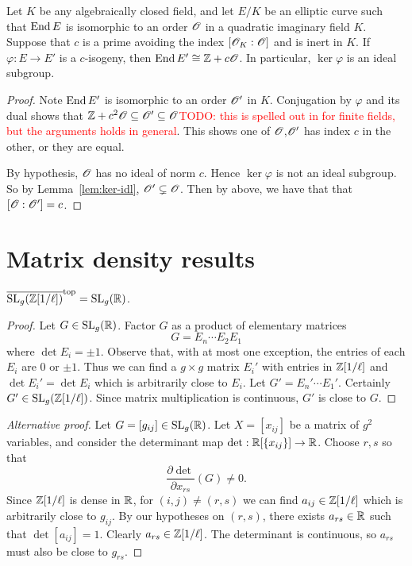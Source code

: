 \documentclass{amsart}
\begin{document}
\begin{lemma}\label{lem:ker-idl-end}
  Let $K$ be any algebraically closed field, and let $E/K$ be an elliptic curve such that $\operatorname{End} E$ is isomorphic to an order $\mathscr{O}$ in a quadratic imaginary field $K$. Suppose that $c$ is a prime avoiding the index $[\mathscr{O}_K : \mathscr{O}]$ and is inert in $K$. If $\varphi: E \to E'$ is a $c$-isogeny, then $\operatorname{End} E' \cong \mathbb{Z} + c\mathscr{O}$. In particular, $\ker\varphi$ is an ideal subgroup.
\end{lemma}
\begin{proof}
  Note $\operatorname{End} E'$ is isomorphic to an order $\mathscr{O}'$ in $K$. Conjugation by $\varphi$ and its dual shows that $\mathbb{Z} + c^2\mathscr{O} \subseteq \mathscr{O}' \subseteq \mathscr{O}$\textcolor{red}{TODO: this is spelled out in \cite[Prop.~21]{kohel1996endomorphisms} for finite fields, but the arguments holds in general}. This shows one of $\mathscr{O}$,$\mathscr{O}'$ has index $c$ in the other, or they are equal.

  By hypothesis, $\mathscr{O}$ has no ideal of norm $c$. Hence $\ker\varphi$ is not an ideal subgroup. So by Lemma~\ref{lem:ker-idl}, $\mathscr{O}' \subsetneq \mathscr{O}$. Then by above, we have that that $[\mathscr{O} : \mathscr{O}'] = c$.
\end{proof}


\section{Matrix density results}
\label{sec:matr-dens-results}

\begin{lemma}\label{lemma:sl-z-1overl-dense-sl-r}
  $\overline{\operatorname{SL}_g(\mathbb{Z}[1/\ell])}^\mathrm{top} = \operatorname{SL}_g(\mathbb{R})$.
\end{lemma}

\begin{proof}
  Let $G \in \operatorname{SL}_g(\mathbb{R})$. Factor $G$ as a product of elementary matrices
  \[
    G = E_n \cdots E_2 E_1
  \]
  where $\det E_i = \pm 1$. Observe that, with at most one exception, the entries of each $E_i$ are $0$ or $\pm 1$. Thus we can find a $g \times g$ matrix $E_i'$ with entries in $\mathbb{Z}[1/\ell]$ and $\det E_i' = \det E_i$ which is arbitrarily close to $E_i$. Let $G' = E_n' \cdots E_1'$. Certainly $G' \in \operatorname{SL}_g(\mathbb{Z}[1/\ell])$. Since matrix multiplication is continuous, $G'$ is close to $G$.
\end{proof}

\begin{proof}[Alternative proof]
  Let $G = [g_{ij}] \in \operatorname{SL}_g(\mathbb{R})$. Let $X = [x_{ij}]$ be a matrix of $g^2$ variables, and consider the determinant map $\det: \mathbb{R}[\{x_{ij}\}] \to \mathbb{R}$. Choose $r,s$ so that
  \[
    \frac{\partial \det}{\partial x_{rs}}(G) \neq 0.
  \]
  Since $\mathbb{Z}[1/\ell]$ is dense in $\mathbb{R}$, for $(i,j) \neq (r,s)$ we can find $a_{ij} \in \mathbb{Z}[1/\ell]$ which is arbitrarily close to $g_{ij}$. By our hypotheses on $(r,s)$, there exists $a_{rs} \in \mathbb{R}$ such that $\det [a_{ij}] = 1$. Clearly $a_{rs} \in \mathbb{Z}[1/\ell]$. The determinant is continuous, so $a_{rs}$ must also be close to $g_{rs}$.
\end{proof}
\end{document}
